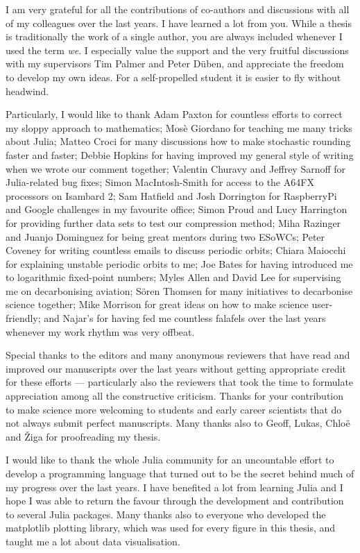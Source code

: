 \begin{acknowledgements}

I am very grateful for all the contributions of co-authors and discussions with all of my colleagues over the last years.
I have learned a lot from you. While a thesis is traditionally the work of a single author, you are always included
whenever I used the term \emph{we}. I especially value the support and the very fruitful discussions with my
supervisors Tim Palmer and Peter D\"{u}ben, and appreciate the freedom to develop my own ideas.
For a self-propelled student it is easier to fly without headwind.

Particularly, I would like to thank 
Adam Paxton for countless efforts to correct my sloppy approach to mathematics;
Mosè Giordano for teaching me many tricks about Julia;
Matteo Croci for many discussions how to make stochastic rounding faster and faster;
Debbie Hopkins for having improved my general style of writing when we wrote our comment together;
Valentin Churavy and Jeffrey Sarnoff for Julia-related bug fixes;
Simon MacIntosh-Smith for access to the A64FX processors on Isambard 2;
Sam Hatfield and Josh Dorrington for RaspberryPi and Google challenges in my favourite office;
Simon Proud and Lucy Harrington for providing further data sets to test our compression method;
Miha Razinger and Juanjo Dominguez for being great mentors during two ESoWCs;
Peter Coveney for writing countless emails to discuss periodic orbits;
Chiara Maiocchi for explaining unstable periodic orbits to me;
Joe Bates for having introduced me to logarithmic fixed-point numbers;
Myles Allen and David Lee for supervising me on decarbonising aviation; 
Sören Thomsen for many initiatives to decarbonise science together;
Mike Morrison for great ideas on how to make science user-friendly;
and
Najar's for having fed me countless falafels over the last years whenever my work rhythm was very offbeat.

Special thanks to the editors and many anonymous reviewers that have read and improved our manuscripts over the
last years without getting appropriate credit for these efforts --- particularly also the reviewers that took the time to
formulate appreciation among all the constructive criticism. Thanks for your contribution to make science more 
welcoming to students and early career scientists that do not always submit perfect manuscripts. Many thanks also
to Geoff, Lukas, Chloë and Žiga for proofreading my thesis.

I would like to thank the whole Julia community for an uncountable effort to develop a programming language that 
turned out to be the secret behind much of my progress over the last years. I have benefited a lot from learning
Julia and I hope I was able to return the favour through the development and contribution to several Julia packages.
Many thanks also to everyone who developed the matplotlib plotting library, which was used for every figure in this thesis,
and taught me a lot about data visualisation.


\end{acknowledgements}
